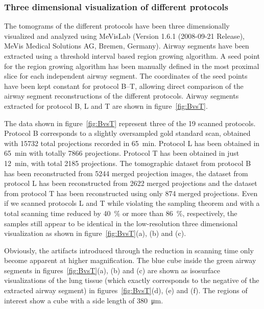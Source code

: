 \subsubsection{Three dimensional visualization of different protocols}%
\label{subsec:comparison}%
The tomograms of the different protocols have been three dimensionally visualized and analyzed using MeVisLab (Version 1.6.1 (2008-09-21 Release), MeVis Medical Solutions AG, Bremen, Germany). Airway segments have been extracted using a threshold interval based region growing algorithm. A seed point for the region growing algorithm has been manually defined in the most proximal slice for each independent airway segment. The coordinates of the seed points have been kept constant for protocol B--T, allowing direct comparison of the airway segment reconstructions of the different protocols. Airway segments extracted for protocol B, L and T are shown in figure~\ref{fig:BvsT}.

The data shown in figure~\ref{fig:BvsT} represent three of the 19 scanned protocols. Protocol B corresponds to a slightly oversampled gold standard scan, obtained with 15732 total projections recorded in \SI{65}{\minute}. Protocol L has been obtained in \SI{65}{\minute} with totally 7866 projections. Protocol T has been obtained in just \SI{12}{\minute}, with total 2185 projections. The tomographic dataset from protocol B has been reconstructed from 5244 merged projection images, the dataset from protocol L has been reconstructed from 2622 merged projections and the dataset from protocol T has been reconstructed using only 874 merged projections. Even if we scanned protocols L and T while violating the sampling theorem and with a total scanning time reduced by \SI{40}{\percent} or more than \SI{86}{\percent}, respectively, the samples still appear to be identical in the low-resolution three dimensional visualization as shown in figure~\ref{fig:BvsT}(a), (b) and (c).

Obviously, the artifacts introduced through the reduction in scanning time only become apparent at higher magnification. The blue cube inside the green airway segments in figures~\ref{fig:BvsT}(a), (b) and (c) are shown as isosurface visualizations of the lung tissue (which exactly corresponds to the negative of the extracted airway segment) in figures~\ref{fig:BvsT}(d), (e) and (f). The regions of interest show a cube with a side length of \SI{380}{\micro\meter}.

